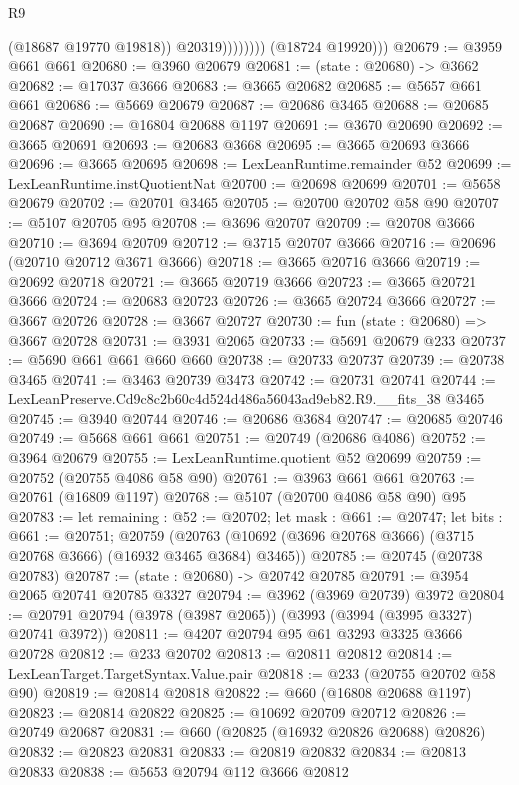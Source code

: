 \begin{lexlean}{R9}
\begin{coremodule}
                          (@18687 @19770 @19818))
                        @20319))))))))
        (@18724 @19920)))
@20679 := @3959 @661 @661
@20680 := @3960 @20679
@20681 := (state : @20680) -> @3662
@20682 := @17037 @3666
@20683 := @3665 @20682
@20685 := @5657 @661 @661
@20686 := @5669 @20679
@20687 := @20686 @3465
@20688 := @20685 @20687
@20690 := @16804 @20688 @1197
@20691 := @3670 @20690
@20692 := @3665 @20691
@20693 := @20683 @3668
@20695 := @3665 @20693 @3666
@20696 := @3665 @20695
@20698 := LexLeanRuntime.remainder @52
@20699 := LexLeanRuntime.instQuotientNat
@20700 := @20698 @20699
@20701 := @5658 @20679
@20702 := @20701 @3465
@20705 := @20700 @20702 @58 @90
@20707 := @5107 @20705 @95
@20708 := @3696 @20707
@20709 := @20708 @3666
@20710 := @3694 @20709
@20712 := @3715 @20707 @3666
@20716 := @20696 (@20710 @20712 @3671 @3666)
@20718 := @3665 @20716 @3666
@20719 := @20692 @20718
@20721 := @3665 @20719 @3666
@20723 := @3665 @20721 @3666
@20724 := @20683 @20723
@20726 := @3665 @20724 @3666
@20727 := @3667 @20726
@20728 := @3667 @20727
@20730 := fun (state : @20680) => @3667 @20728
@20731 := @3931 @2065
@20733 := @5691 @20679 @233
@20737 := @5690 @661 @661 @660 @660
@20738 := @20733 @20737
@20739 := @20738 @3465
@20741 := @3463 @20739 @3473
@20742 := @20731 @20741
@20744 := LexLeanPreserve.Cd9c8c2b60c4d524d486a56043ad9eb82.R9.__fits_38 @3465
@20745 := @3940 @20744
@20746 := @20686 @3684
@20747 := @20685 @20746
@20749 := @5668 @661 @661
@20751 := @20749 (@20686 @4086)
@20752 := @3964 @20679
@20755 := LexLeanRuntime.quotient @52 @20699
@20759 := @20752 (@20755 @4086 @58 @90)
@20761 := @3963 @661 @661
@20763 := @20761 (@16809 @1197)
@20768 := @5107 (@20700 @4086 @58 @90) @95
@20783 := let remaining : @52 := @20702;
  let mask : @661 := @20747;
  let bits : @661 := @20751;
  @20759 (@20763 (@10692 (@3696 @20768 @3666) (@3715 @20768 @3666) (@16932 @3465 @3684) @3465))
@20785 := @20745 (@20738 @20783)
@20787 := (state : @20680) -> @20742 @20785
@20791 := @3954 @2065 @20741 @20785 @3327
@20794 := @3962 (@3969 @20739) @3972
@20804 := @20791 @20794 (@3978 (@3987 @2065)) (@3993 (@3994 (@3995 @3327) @20741 @3972))
@20811 := @4207 @20794 @95 @61 @3293 @3325 @3666 @20728
@20812 := @233 @20702
@20813 := @20811 @20812
@20814 := LexLeanTarget.TargetSyntax.Value.pair
@20818 := @233 (@20755 @20702 @58 @90)
@20819 := @20814 @20818
@20822 := @660 (@16808 @20688 @1197)
@20823 := @20814 @20822
@20825 := @10692 @20709 @20712
@20826 := @20749 @20687
@20831 := @660 (@20825 (@16932 @20826 @20688) @20826)
@20832 := @20823 @20831
@20833 := @20819 @20832
@20834 := @20813 @20833
@20838 := @5653 @20794 @112 @3666 @20812

\end{coremodule}
\end{lexlean}
